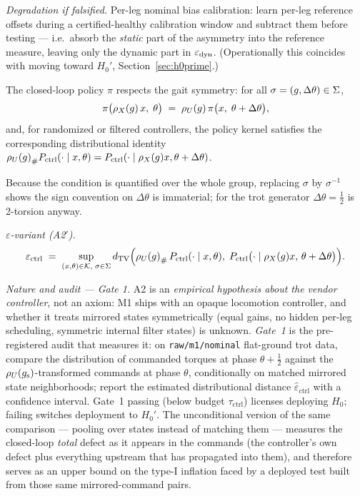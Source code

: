 \emph{Degradation if falsified.} Per-leg nominal bias calibration: learn
per-leg reference offsets during a certified-healthy calibration window and
subtract them before testing --- i.e.\ absorb the \emph{static} part of the
asymmetry into the reference measure, leaving only the dynamic part in
$\varepsilon_{\mathrm{dyn}}$. (Operationally this coincides with moving toward $H_0'$,
Section~\ref{sec:h0prime}.)

\begin{assumption}
\label{as:ctrl}
The closed-loop policy $\pi$ respects the gait symmetry: for all
$\sigma = (g, \Delta\theta) \in \Sigma$,
\[
  \pi\bigl(\rho_{X}(g)\,x,\; \theta\bigr)
  \;=\;
  \rho_{U}(g)\,\pi\bigl(x,\; \theta + \Delta\theta\bigr),
\]
and, for randomized or filtered controllers, the policy kernel satisfies the
corresponding distributional identity
${\rho_{U}(g)}_{\#} P_{\mathrm{ctrl}}(\cdot \mid x, \theta)
= P_{\mathrm{ctrl}}(\cdot \mid \rho_{X}(g)x, \theta + \Delta\theta)$.
\end{assumption}

Because the condition is quantified over the whole group, replacing $\sigma$
by $\sigma^{-1}$ shows the sign convention on $\Delta\theta$ is immaterial;
for the trot generator $\Delta\theta = \tfrac12$ is 2-torsion anyway.

\emph{$\varepsilon$-variant (A2$'$).}
\[
  \varepsilon_{\mathrm{ctrl}}
  \;=\;
  \sup_{(x,\theta) \in \mathcal{K},\; \sigma \in \Sigma}
  d_{\mathrm{TV}}\Bigl(
    {\rho_{U}(g)}_{\#}\, P_{\mathrm{ctrl}}(\cdot \mid x, \theta),\;
    P_{\mathrm{ctrl}}\bigl(\cdot \mid \rho_{X}(g)x,\, \theta + \Delta\theta\bigr)
  \Bigr) .
\]

\emph{Nature and audit --- Gate 1.} A2 is an \emph{empirical hypothesis about
the vendor controller}, not an axiom: M1 ships with an opaque locomotion
controller, and whether it treats mirrored states symmetrically (equal gains,
no hidden per-leg scheduling, symmetric internal filter states) is unknown.
\emph{Gate~1} is the pre-registered audit that measures it: on
\texttt{raw/m1/nominal} flat-ground trot data, compare the distribution of
commanded torques at phase $\theta + \tfrac12$ against the
$\rho_{U}(g_{\mathrm{s}})$-transformed commands at phase $\theta$, conditionally on matched
mirrored state neighborhoods; report the estimated distributional distance
$\hat\varepsilon_{\mathrm{ctrl}}$ with a confidence interval. Gate~1 passing
(below budget $\tau_{\mathrm{ctrl}}$) licenses deploying $H_0$; failing
switches deployment to $H_0'$. The unconditional version of the same
comparison --- pooling over states instead of matching them --- measures the
closed-loop \emph{total} defect as it appears in the commands (the
controller's own defect plus everything upstream that has propagated into
them), and therefore serves as an upper bound on the type-I inflation faced
by a deployed test built from those same mirrored-command pairs.

